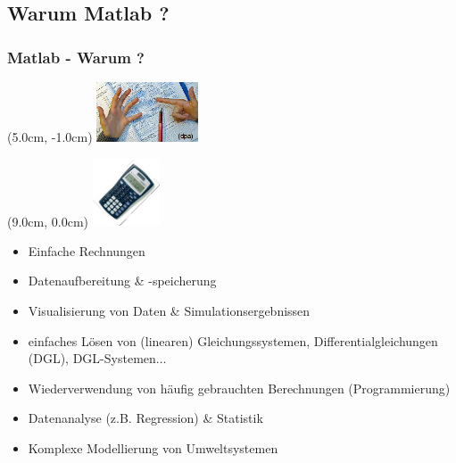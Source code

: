     \subsection{Warum Matlab ?}
    \begin{frame}
      \frametitle{Matlab - Warum ?}
      \begin{textblock*}{0cm}(5.0cm, -1.0cm)
        \includegraphics[width=3.0cm]{rechnen1.png}
      \end{textblock*}
      \begin{textblock*}{0cm}(9.0cm, 0.0cm)
        \includegraphics[width=2.0cm]{rechnen2.png}
      \end{textblock*}

      \begin{itemize}
        \itemsep0.4cm
        \item Einfache Rechnungen
        \item Datenaufbereitung \& -speicherung
        \item Visualisierung von Daten \& Simulationsergebnissen
        \item einfaches Lösen von (linearen) Gleichungssystemen, Differentialgleichungen (DGL), DGL-Systemen...
        \item Wiederverwendung von häufig gebrauchten Berechnungen (Programmierung)
        \item Datenanalyse (z.B. Regression) \& Statistik
        \item Komplexe Modellierung von Umweltsystemen
      \end{itemize}
    \end{frame}

